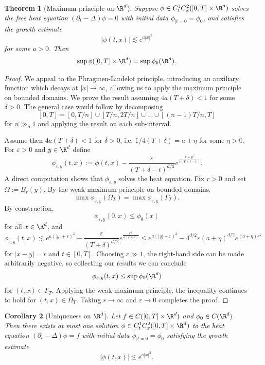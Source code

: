 \documentclass[reqno]{amsart}
\newtheorem{theorem}{Theorem}
\newtheorem{corollary}[theorem]{Corollary}
\theoremstyle{definition}
\theoremstyle{remark}
\renewcommand{\epsilon}{\varepsilon}
\begin{document}
\begin{theorem}[Maximum principle on $\R^d$]
	Suppose $\phi \in C^1_t C^2_x ([0, T] \times \R^d)$ solves the free heat equation $(\partial_t - \Delta)\phi = 0$ with initial data $\phi_{|t = 0} = \phi_0$, and satisfies the growth estimate
		\[ |\phi(t, x)| \lesssim e^{a|x|^2}\]
	for some $a > 0$. Then 
		\[ \sup \phi ([0, T] \times \R^d)= \sup \phi_0 (\R^d). \]	
\end{theorem}

\begin{proof}
	We appeal to the Phragmen-Lindelof principle, introducing an auxiliary function which decays at $|x|\to \infty$, allowing us to apply the maximum principle on bounded domains. We prove the result assuming $4a (T + \delta) < 1$ for some $\delta > 0$. The general case would follow by decomposing 
		\[ [0, T] = [0, T/n] \cup [T/n, 2T/n] \cup \dots \cup [(n - 1)T/n, T] \]
	for $n \gg_a 1$ and applying the result on each sub-interval. 
	
	Assume then $4a (T + \delta) < 1$ for $\delta > 0$, i.e. $1/4(T + \delta) = a + \eta$ for some $\eta > 0$. For $\epsilon > 0$ and $y \in \R^d$ define 	
		\[ \phi_{\epsilon, y} (t, x) := \phi(t, x) - \frac{\epsilon}{(T + \delta - t)^{d/2}} e^{\frac{|x - y|^2}{4(T + \delta - t)}}. \]
	A direct computation shows that $\phi_{\epsilon, y}$ solves the heat equation. Fix $r > 0$ and set $\Omega := B_r (y)$. By the weak maximum principle on bounded domains, 
		\[ \max \phi_{\epsilon, y} (\Omega_T) = \max \phi_{\epsilon, y} (\Gamma_T). \]
	By construction, 
		\[ \phi_{\epsilon, y} (0, x) \leq \phi_0 (x)  \]	
	for all $x \in \R^d$, and 
		\[ \phi_{\epsilon, y} (t, x) \lesssim e^{a(|y| + r)^2} -\frac{\epsilon}{(T + \delta)^{d/2}} e^{\frac{r^2}{4(T + \delta)}} \leq e^{a(|y| + r)^2} - 4^{d/2}\epsilon (a + \eta)^{d/2} e^{(a + \eta) r^2} \]
	for $|x - y| = r$ and $t \in [0, T]$. Choosing $r \gg 1$, the right-hand side can be made arbitrarily negative, so collecting our results we can conclude
		\[ \phi_{\epsilon, y} (t, x) \leq \sup \phi_0 (\R^d) \]
	for $(t, x) \in \Gamma_T$. Applying the weak maximum principle, the inequality continues to hold for $(t, x) \in \Omega_T$. Taking $r \to \infty$ and $\epsilon \to 0$ completes the proof. 
\end{proof}

\begin{corollary}[Uniqueness on $\R^d$]
	Let $f \in C([0, T] \times \R^d)$ and $\phi_0 \in C (\R^d)$. Then there exists at most one solution $\phi \in C^1_t C^2_x ([0, T] \times \R^d)$ to the heat equation $(\partial_t - \Delta)\phi = f$ with initial data $\phi_{|t = 0} = \phi_0$ satisfying the growth estimate
		\[ |\phi(t, x)| \lesssim e^{a|x|^2}. \]
\end{corollary}
\end{document}

